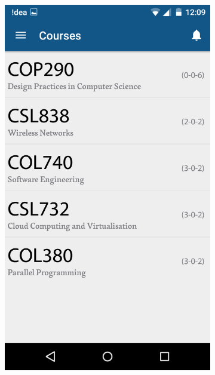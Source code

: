 \documentclass{article}
\begin{document}
\begin{itemize}
\begin{figure}[!h]
\begin{subfigure}{.4\textwidth}
	\includegraphics[width=0.8\linewidth]{pic2}
    \caption*{}
\end{subfigure}
\begin{subfigure}{.4\textwidth}
  \centering

\end{subfigure}
\end{figure}
\end{itemize}
\end{document}
